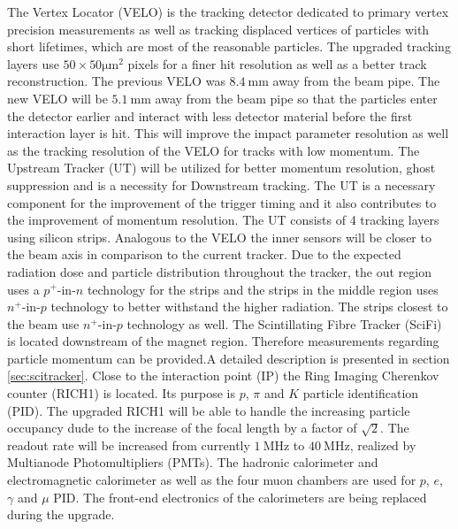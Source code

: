 The Vertex Locator (VELO) is the tracking detector dedicated to primary vertex precision measurements as well as tracking displaced vertices of particles with short lifetimes, which are most of the reasonable particles. The upgraded tracking layers use $50\times50\si{\micro\metre}^2$ pixels for a finer hit resolution as well as a better track reconstruction. The previous VELO was $\SI{8.4}{\milli\metre}$ away from the beam pipe. The new VELO will be $\SI{5.1}{\milli\metre}$ away from the beam pipe so that the particles enter the detector earlier and interact with less detector material before the first interaction layer is hit.
This will improve the impact parameter resolution as well as the tracking resolution of the VELO for tracks with low momentum\cite{Piucci}.
The Upstream Tracker (UT) will be utilized for better momentum resolution, ghost suppression and is a necessity for Downstream tracking.
The UT is a necessary component for the improvement of the trigger timing and it also contributes to the improvement of momentum resolution. The UT consists of 4 tracking layers using silicon strips. Analogous to the VELO the inner sensors will be closer to the beam axis in comparison to the current tracker.
Due to the expected radiation dose and particle distribution throughout the tracker, the out region uses a $p^{+}$-in-$n$ technology for the strips and the strips in the middle region uses $n^{+}$-in-$p$ technology to better withstand the higher radiation. The strips closest to the beam use $n^{+}$-in-$p$ technology as well.
The Scintillating Fibre Tracker (SciFi) is located downstream of the magnet region. Therefore measurements regarding particle momentum can be provided.A detailed description is presented in section \ref{sec:scitracker}.
Close to the interaction point (IP) the Ring Imaging Cherenkov counter (RICH1) is located. Its purpose is $p$, $\pi$ and $K$ particle identification (PID).
The upgraded RICH1 will be able to handle the increasing particle occupancy dude to the increase of the focal length by a factor of $\sqrt{2}$.
The readout rate will be increased from currently $\SI{1}{\mega\hertz}$ to $\SI{40}{\mega\hertz}$, realized by Multianode Photomultipliers (PMTs).
The hadronic calorimeter and electromagnetic calorimeter as well as the four muon chambers are used for $p$, $e$, $\gamma$ and $\mu$ PID. The front-end electronics of the calorimeters are being replaced during the upgrade.

